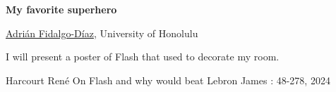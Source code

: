 \documentclass[a4paper, 11pt]{article}
\newcommand{\abstracttitle}[1]{{
    \centering
    \LARGE \textbf{#1}\\
    \vspace*{0.7cm}
}}
\newcommand{\firstauthor}[2]{{
    \centering
    \underline{#1}, \textsf{#2}\\
    \vspace*{0.25cm}
}}
\newcommand{\abstracttext}[1]{
    \vspace{0.6cm}
    #1
}
\begin{document}
\abstracttitle{My favorite superhero}

\firstauthor{Adrián Fidalgo-Díaz}{University of Honolulu}

\abstracttext{
    I will present a poster of Flash that used to decorate my room.
}

\begin{thebibliography}{9}
Harcourt René
\newblock On Flash and why would beat Lebron James
: 48-278, 2024
\end{thebibliography}
\end{document}
